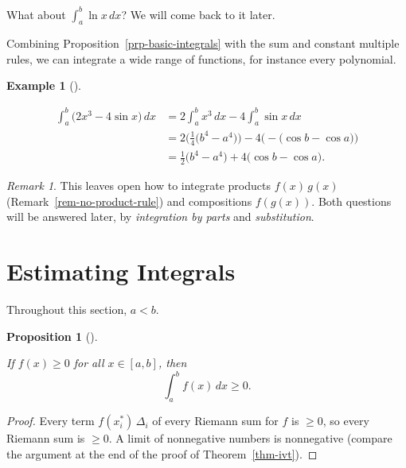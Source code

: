 \documentclass[
  letterpaper,
  DIV=11,
  numbers=noendperiod]{scrreprt}
\theoremstyle{plain}
\theoremstyle{plain}
\newtheorem{proposition}{Proposition}[chapter]
\theoremstyle{definition}
\theoremstyle{definition}
\theoremstyle{definition}
\newtheorem{example}{Example}[chapter]
\theoremstyle{plain}
\theoremstyle{plain}
\theoremstyle{remark}
\newtheorem{refremark}{Remark}[chapter]
\begin{document}
What about \(\int_a^b \ln x\,dx\)? We will come back to it later.

Combining Proposition~\ref{prp-basic-integrals} with the sum and
constant multiple rules, we can integrate a wide range of functions, for
instance every polynomial.

\begin{example}[]\protect\hypertarget{exm-linear-combination}{}\label{exm-linear-combination}

\hfill\break
\[
\begin{aligned}
\int_a^b \big(2x^3 - 4\sin x\big)\,dx
&= 2\int_a^b x^3\,dx - 4\int_a^b \sin x\,dx \\
&= 2\Big(\frac14\big(b^4-a^4\big)\Big) - 4\Big(-\big(\cos b - \cos a\big)\Big) \\
&= \frac12\big(b^4-a^4\big) + 4\big(\cos b-\cos a\big).
\end{aligned}
\]

\end{example}

\begin{refremark}
This leaves open how to integrate products \(f(x)\,g(x)\)
(Remark~\ref{rem-no-product-rule}) and compositions \(f(g(x))\). Both
questions will be answered later, by \emph{integration by parts} and
\emph{substitution}.

\label{rem-products-compositions}

\end{refremark}

\section{Estimating Integrals}\label{estimating-integrals}

Throughout this section, \(a<b\).

\begin{proposition}[]\protect\hypertarget{prp-integral-nonneg}{}\label{prp-integral-nonneg}

\hfill\break
If \(f(x)\ge0\) for all \(x\in[a,b]\), then \[
\int_a^b f(x)\,dx \ge 0 .
\]

\end{proposition}

\begin{proof}
Every term \(f(x_i^*)\,\Delta_i\) of every Riemann sum for \(f\) is
\(\ge0\), so every Riemann sum is \(\ge0\). A limit of nonnegative
numbers is nonnegative (compare the argument at the end of the proof of
Theorem~\ref{thm-ivt}).
\end{proof}
\end{document}
